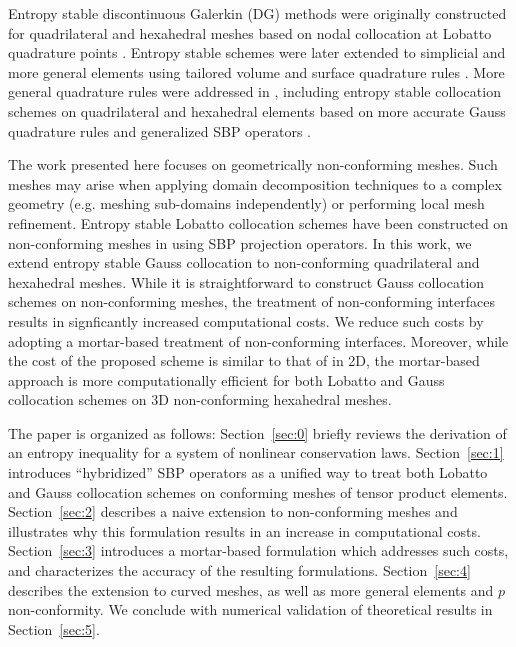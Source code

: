 \documentclass{svjour3}                     %
\begin{document}
Entropy stable discontinuous Galerkin (DG) methods were originally constructed for quadrilateral and hexahedral meshes based on nodal collocation at Lobatto quadrature points \cite{fisher2013high, carpenter2014entropy, gassner2016split}.  Entropy stable schemes were later extended to simplicial and more general elements using tailored volume and surface quadrature rules \cite{chen2017entropy, crean2018entropy}.   More general quadrature rules were addressed in \cite{chan2017discretely, chan2018discretely, chan2018efficient, chan2019skew}, including entropy stable collocation schemes on quadrilateral and hexahedral elements based on more accurate Gauss quadrature rules and generalized SBP operators \cite{chan2018efficient}.

The work presented here focuses on geometrically non-conforming meshes.  Such meshes may arise when applying domain decomposition techniques to a complex geometry (e.g. meshing sub-domains independently)  \cite{bernardi1993domain} or performing local mesh refinement.  Entropy stable Lobatto collocation schemes have been constructed on non-conforming meshes in \cite{friedrich2017entropy} using SBP projection operators.  In this work, we extend entropy stable Gauss collocation to non-conforming quadrilateral and hexahedral meshes.  While it is straightforward to construct Gauss collocation schemes on non-conforming meshes, the treatment of non-conforming interfaces results in signficantly increased computational costs.  We reduce such costs by adopting a mortar-based treatment of non-conforming interfaces.  Moreover, while the cost of the proposed scheme is similar to that of  \cite{friedrich2017entropy} in 2D, the mortar-based approach is more computationally efficient for both Lobatto and Gauss collocation schemes on 3D non-conforming hexahedral meshes.  

The paper is organized as follows: Section~\ref{sec:0} briefly reviews the derivation of an entropy inequality for a system of nonlinear conservation laws.  Section~\ref{sec:1} introduces ``hybridized'' SBP operators as a unified way to treat both Lobatto and Gauss collocation schemes on conforming meshes of tensor product elements.  Section~\ref{sec:2} describes a naive extension to non-conforming meshes and illustrates why this formulation results in an increase in computational costs.  Section~\ref{sec:3} introduces a mortar-based formulation which addresses such costs, and characterizes the accuracy of the resulting formulations.  Section~\ref{sec:4} describes the extension to curved meshes, as well as more general elements and $p$ non-conformity.  We conclude with numerical validation of theoretical results in Section~\ref{sec:5}.  
\end{document}
